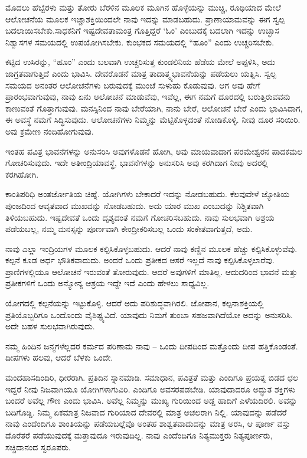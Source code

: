 ಮೊದಲು ಹೆಬ್ಬೆರಳು ಮತ್ತು ತೋರು ಬೆರಳಿನ ಮೂಲಕ ಮೂಗಿನ ಹೊಳ್ಳೆಯನ್ನು ಮುಚ್ಚಿ, ರೂಢಿಯಾದ ಮೇಲೆ ಆಲೋಚನೆಯ ಮೂಲಕ ಇಚ್ಚಾಶಕ್ತಿಯಿಂದಲೇ ನಾವು ಇದನ್ನು ಮಾಡಬಹುದು. ಪ್ರಾಣಾಯಾಮವನ್ನು ಈಗ ಸ್ವಲ್ಪ ಬದಲಾಯಿಸಬೇಕು.\break ಸಾಧಕನಿಗೆ ಇಷ್ಟದೇವತಾಮಂತ್ರ ಗೊತ್ತಿದ್ದರೆ `ಓಂ' ಎಂಬುದಕ್ಕೆ ಬದಲಾಗಿ ಇದನ್ನು ಉಚ್ಛಾಸ ನಿಶ್ವಾಸಗಳ ಸಮಯದಲ್ಲಿ ಉಪಯೋಗಿಸಬೇಕು. ಕುಂಭಕದ ಸಮಯದಲ್ಲಿ “ಹೂಂ'' ಎಂದು ಉಚ್ಚರಿಸಬೇಕು.

ಕಟ್ಟಿದ ಉಸಿರನ್ನು, “ಹೂಂ” ಎಂದು ಬಲವಾಗಿ ಉಚ್ಚರಿಸುತ್ತ ಕುಂಡಲಿನಿಯ ಹೆಡೆಯ ಮೇಲೆ ಅಪ್ಪಳಿಸಿ, ಅದು ಜಾಗ್ರತವಾಗುತ್ತಿದೆ ಎಂದು ಭಾವಿಸಿ. ದೇವರೊಡನೆ ಮಾತ್ರ ತಾದಾತ್ಮ್ಯಭಾವನೆಯನ್ನು ಪಡೆಯಲು ಯತ್ನಿಸಿ. ಸ್ವಲ್ಪ ಸಮಯದ ಅನಂತರ ಆಲೋಚನೆಗಳು ಬರುವುದಕ್ಕೆ ಮುಂಚೆ ಸುಳುಹು ಕೊಡುವುವು. ಆಗ ಅವು ಹೇಗೆ ಪ್ರಾರಂಭವಾಗುವುವು, ನಾವು ಏನು ಆಲೋಚನೆ ಮಾಡುವೆವು, ಇವೆಲ್ಲ, ಈಗ ನಮಗೆ ದೂರದಲ್ಲಿ ಬರುತ್ತಿರುವವನು ಕಾಣುವಂತೆ ಗೊತ್ತಾಗುವುವು. ಮನಸ್ಸಿನಿಂದ ನಾವು ಬೇರೆಯಾಗಿ, ನಾನು ಬೇರೆ, ಆಲೋಚನೆ ಬೇರೆ ಎಂದು ಭಾವಿಸಿದಾಗ, ಈ ಅವಸ್ಥೆ ನಮಗೆ ಸಿದ್ಧಿಸುವುದು. ಆಲೋಚನೆಗಳು ನಿಮ್ಮನ್ನು ಮೆಟ್ಟಿಕೊಳ್ಳದಂತೆ ನೋಡಿಕೊಳ್ಳಿ. ನೀವು ದೂರ ಸರಿಯಿರಿ. ಅವು ಕ್ರಮೇಣ ನಂದಿಹೋಗುವುವು.

ಇಂತಹ ಪವಿತ್ರ ಭಾವನೆಗಳನ್ನು ಅನುಸರಿಸಿ ಅವುಗಳೊಡನೆ ಹೋಗಿ, ಅವು ಮಾಯವಾದಾಗ ಪರಮೇಶ್ವರನ ಪಾದಕಮಲ ಗೋಚರಿಸುವುದು. ಇದೇ ಅತೀಂದ್ರಿಯಾವಸ್ಥೆ, ಭಾವನೆಗಳನ್ನು ಅನುಸರಿಸಿ ಅವು ಕರಗಿದಾಗ ನೀವು ಅದರಲ್ಲಿ ಕರಗಿಹೋಗಿ.

ಕಾಂತಿಪರಿಧಿ ಅಂತರ್ಜೋತಿಯ ಚಿಹ್ನೆ. ಯೋಗಿಗಳು ಬೇಕಾದರೆ ಇದನ್ನು ನೋಡಬಹುದು. ಕೆಲವುವೇಳೆ ಜ್ಯೋತಿಯ ಪುಂಜದಿಂದ ಆವೃತವಾದ ಮುಖವನ್ನು ನೋಡಬಹುದು. ಅದು ಯಾರ ಮುಖ ಎಂಬುದನ್ನು ನಿಶ್ಚಿತವಾಗಿ ತಿಳಿಯಬಹುದು. ಇಷ್ಟದೇವತೆ ಒಂದು ದೃಶ್ಯದಂತೆ ನಮಗೆ ಗೋಚರಿಸಬಹುದು. ನಾವು ಸುಲಭವಾಗಿ ಆಶ್ರಯ ಪಡೆಯಬಲ್ಲ, ನಮ್ಮ ಮನಸ್ಸನ್ನು ಪೂರ್ಣವಾಗಿ ಕೇಂದ್ರೀಕರಿಸಬಲ್ಲ ಒಂದು ಸಂಕೇತವಾಗುತ್ತದೆ, ಅದು.

ನಾವು ಎಲ್ಲಾ ಇಂದ್ರಿಯಗಳ ಮೂಲಕ ಕಲ್ಪಿಸಿಕೊಳ್ಳಬಹುದು. ಆದರೆ ನಾವು ಕಣ್ಣಿನ ಮೂಲಕ ಹೆಚ್ಚು ಕಲ್ಪಿಸಿಕೊಳ್ಳುವೆವು. ಕಲ್ಪನೆ ಕೂಡ ಅರ್ಧ ಭೌತಿಕವಾದುದು. ಅಂದರೆ ಒಂದು ಪ್ರತೀಕದ ಆಸರೆ ಇಲ್ಲದೆ ನಾವು ಕಲ್ಪಿಸಿಕೊಳ್ಳಲಾರೆವು. ಪ್ರಾಣಿಗಳಲ್ಲಿಯೂ ಆಲೋಚನೆ ಇರುವಂತೆ ತೋರುವುದು. ಆದರೆ ಅವುಗಳಿಗೆ ಮಾತಿಲ್ಲ. ಆದುದರಿಂದ ಭಾವನೆ ಮತ್ತು ಪ್ರತೀಕಗಳಿಗೆ ಒಂದು ಅನ್ಯೋನ್ಯ ಆಶ್ರಯ ಇದ್ದೇ ಇದೆ ಎಂದು ಹೇಳಲು ಸಾಧ್ಯವಿಲ್ಲ.

ಯೋಗದಲ್ಲಿ ಕಲ್ಪನೆಯನ್ನು ಇಟ್ಟುಕೊಳ್ಳಿ. ಆದರೆ ಅದು ಪರಿಶುದ್ಧವಾಗಿರಲಿ. ಜೋಪಾನ, ಕಲ್ಪನಾಶಕ್ತಿಯಲ್ಲಿ ಪ್ರತಿಯೊಬ್ಬರಿಗೂ ಒಂದೊಂದು ವೈಶಿಷ್ಟ್ಯವಿದೆ. ಯಾವುದು ನಿಮಗೆ ತುಂಬಾ ಸಹಜವಾಗಿದೆಯೋ ಅದನ್ನು ಅನುಸರಿಸಿ. ಅದೇ ಬಹಳ ಸುಲಭವಾಗಿರುವುದು.

ನಮ್ಮ ಹಿಂದಿನ ಜನ್ಮಗಳೆಲ್ಲದರ ಕರ್ಮದ ಪರಿಣಾಮ ನಾವು – ಒಂದು ದೀಪದಿಂದ ಮತ್ತೊಂದು ದೀಪ ಹತ್ತಿಕೊಂಡಂತೆ. ದೀಪಗಳು ಹಲವು, ಆದರೆ ಬೆಳಕು ಒಂದೇ.

ಮಂದಹಾಸದಿಂದಿರಿ, ಧೀರರಾಗಿ. ಪ್ರತಿದಿನ ಸ್ನಾನಮಾಡಿ. ಸಮಾಧಾನ, ಪವಿತ್ರತೆ ಮತ್ತು ಎಂದಿಗೂ ಪ್ರಯತ್ನ ಬಿಡದ ಛಲ ಇದ್ದರೆ ನೀವು ನಿಜವಾಗಿಯೂ ಯೋಗಿಗಳಾಗುವಿರಿ. ಎಂದಿಗೂ ಅವಸರಪಡಬೇಡಿ. ಯಾವುದಾದರೂ ಅದ್ಭುತ ಶಕ್ತಿಗಳು ಬಂದರೆ ಅವೆಲ್ಲ ಗೌಣ ಎಂದು ಭಾವಿಸಿ. ಅವೆಲ್ಲ ನಿಮ್ಮನ್ನು ಮುಖ್ಯ ಗುರಿಯಿಂದ ಅಡ್ಡ ಹಾದಿಗೆ ಎಳೆಯದಿರಲಿ. ಅವನ್ನು ಬದಿಗೊಡ್ಡಿ. ನಿಮ್ಮ ಏಕಮಾತ್ರ ನಿಜವಾದ ಗುರಿಯಾದ ದೇವರಲ್ಲಿ ಮಾತ್ರ ಅಚಲರಾಗಿ ನಿಲ್ಲಿ. ಯಾವುದನ್ನು ಪಡೆದರೆ ನಾವು ಎಂದೆಂದಿಗೂ ಶಾಂತಿಯನ್ನು ಪಡೆಯಬಲ್ಲೆವೊ ಅಂತಹ ಶಾಶ್ವತವಾದುದನ್ನು ಮಾತ್ರ ಅರಸಿ, ಆ ಪೂರ್ಣ ವಸ್ತು ದೊರೆತರೆ ಪಡೆಯುವುದಕ್ಕೆ ಮತ್ತಾವುದೂ ಇರುವುದಿಲ್ಲ. ನಾವು ಎಂದೆಂದಿಗೂ ನಿತ್ಯಮುಕ್ತರು ನಿತ್ಯಪೂರ್ಣರು, ಸಚ್ಚಿದಾನಂದ ಸ್ವರೂಪರು.

